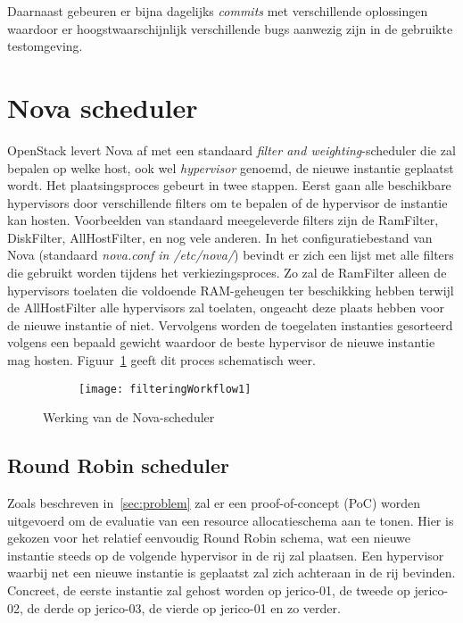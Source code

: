 Daarnaast gebeuren er bijna dagelijks \textit{commits} met verschillende oplossingen waardoor er hoogstwaarschijnlijk verschillende bugs aanwezig zijn in de gebruikte testomgeving.

\section{Nova scheduler}

OpenStack levert Nova af met een standaard \textit{filter and weighting}-scheduler die zal bepalen op welke host, ook wel \textit{hypervisor} genoemd, de nieuwe instantie geplaatst wordt. Het plaatsingsproces gebeurt in twee stappen. Eerst gaan alle beschikbare hypervisors door verschillende filters om te bepalen of de hypervisor de instantie kan hosten. Voorbeelden van standaard meegeleverde filters zijn de RamFilter, DiskFilter, AllHostFilter, en nog vele anderen. In het configuratiebestand van Nova (standaard \textit{nova.conf in /etc/nova/}) bevindt er zich een lijst met alle filters die gebruikt worden tijdens het verkiezingsproces. Zo zal de RamFilter alleen de hypervisors toelaten die voldoende RAM-geheugen ter beschikking hebben terwijl de AllHostFilter alle hypervisors zal toelaten, ongeacht deze plaats hebben voor de nieuwe instantie of niet. Vervolgens worden de toegelaten instanties gesorteerd volgens een bepaald gewicht waardoor de beste hypervisor de nieuwe instantie mag hosten. Figuur~\ref{fig:filteringWorkflow} geeft dit proces schematisch weer.

\begin{figure}
  \centering
  \captionsetup{justification=centering}
  \begin{subfigure}{\textwidth}
    \centering
    \centerline{
      \texttt{[image: filteringWorkflow1]}
    }
  \end{subfigure}
  \caption{Werking van de Nova-scheduler~\cite{OpenStack2017c}}
  \label{fig:filteringWorkflow}
\end{figure}

\subsection{Round Robin scheduler}

Zoals beschreven in~\ref{sec:problem} zal er een proof-of-concept (PoC) worden uitgevoerd om de evaluatie van een resource allocatieschema aan te tonen. Hier is gekozen voor het relatief eenvoudig Round Robin schema, wat een nieuwe instantie steeds op de volgende hypervisor in de rij zal plaatsen. Een hypervisor waarbij net een nieuwe instantie is geplaatst zal zich achteraan in de rij bevinden. Concreet, de eerste instantie zal gehost worden op jerico-01, de tweede op jerico-02, de derde op jerico-03, de vierde op jerico-01 en zo verder.

